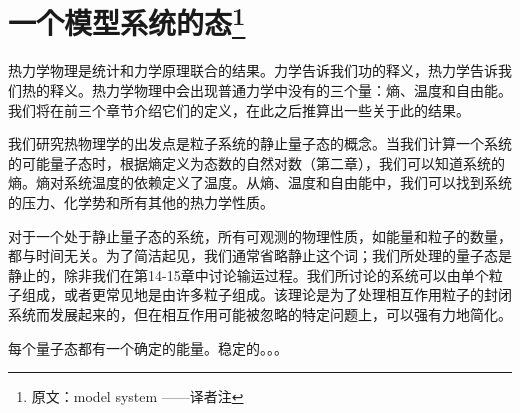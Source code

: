 \chapter[一个模型系统的态]{一个模型系统的态\footnote{原文：model system ——译者注}}

热力学物理是统计和力学原理联合的结果。力学告诉我们功的释义，热力学告诉我们热的释义。热力学物理中会出现普通力学中没有的三个量：熵、温度和自由能。我们将在前三个章节介绍它们的定义，在此之后推算出一些关于此的结果。

我们研究热物理学的出发点是粒子系统的静止量子态的概念。当我们计算一个系统的可能量子态时，根据熵定义为态数的自然对数（第二章），我们可以知道系统的熵。熵对系统温度的依赖定义了温度。从熵、温度和自由能中，我们可以找到系统的压力、化学势和所有其他的热力学性质。

对于一个处于静止量子态的系统，所有可观测的物理性质，如能量和粒子的数量，都与时间无关。为了简洁起见，我们通常省略静止这个词；我们所处理的量子态是静止的，除非我们在第14-15章中讨论输运过程。我们所讨论的系统可以由单个粒子组成，或者更常见地是由许多粒子组成。该理论是为了处理相互作用粒子的封闭系统而发展起来的，但在相互作用可能被忽略的特定问题上，可以强有力地简化。

每个量子态都有一个确定的能量。稳定的。。。

